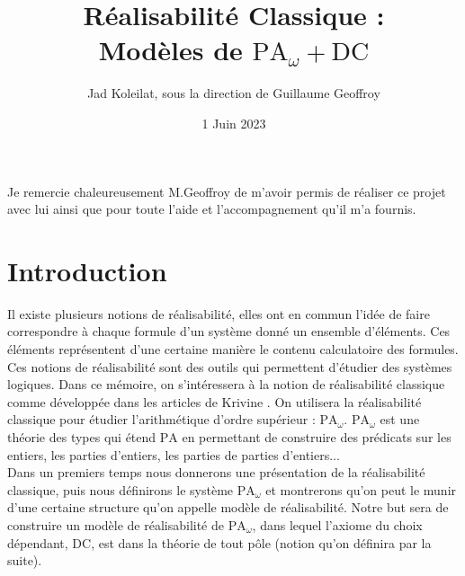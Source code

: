 \documentclass[a4paper,12pt]{article}
\theoremstyle{rmqstyle}
\newcommand{\PA}{\mathrm{PA}}
\newcommand{\DC}{\mathrm{DC}}
\begin{document}

\begin{titlepage}
\title{Réalisabilité Classique :\\
Modèles de $\PA_\omega + \DC$} 
\author{Jad Koleilat, sous la direction de Guillaume Geoffroy}
\date{1 Juin 2023}
\maketitle
{}
\thispagestyle{empty}
\end{titlepage}

\vspace*{\fill}
Je remercie chaleureusement M.Geoffroy de m'avoir permis de réaliser ce projet avec lui ainsi que pour toute l'aide et l'accompagnement qu'il m'a fournis.
\vspace*{\fill}
\thispagestyle{empty}
\clearpage

\tableofcontents
\thispagestyle{empty}


\clearpage


\setcounter{secnumdepth}{0}

\section{Introduction}
\label{introduction}

Il existe plusieurs notions de réalisabilité, elles ont en commun l'idée de faire correspondre à chaque formule d'un système donné un ensemble d'éléments. Ces éléments représentent d'une certaine manière le contenu calculatoire des formules. Ces notions de réalisabilité sont des outils qui permettent d'étudier des systèmes logiques. Dans ce mémoire, on s'intéressera à la notion de réalisabilité classique comme développée dans les articles de Krivine \cite{KrivineRC} \cite{KrivineRA2}. On utilisera la réalisabilité classique pour étudier l'arithmétique d'ordre supérieur : $\PA_\omega$. $\PA_\omega$ est une théorie des types qui étend $\PA$ en permettant de construire des prédicats sur les entiers, les parties d'entiers, les parties de parties d'entiers...\\

Dans un premiers temps nous donnerons une présentation de la réalisabilité classique, puis nous définirons le système $\PA_\omega$ et montrerons qu'on peut le munir d'une certaine structure qu'on appelle modèle de réalisabilité. Notre but sera de construire un modèle de réalisabilité de $\PA_\omega$, dans lequel l'axiome du choix dépendant, $\DC$, est dans la théorie de tout pôle (notion qu'on définira par la suite).\\
\end{document}
